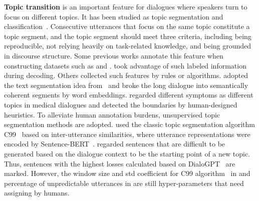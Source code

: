 \textbf{Topic transition} is an important feature for dialogues where speakers turn to focus on different topics. It has been studied as topic segmentation and classification~\cite{takanobu2018weakly}. Consecutive utterances that focus on the same topic constitute a topic segment, and the topic segment should meet three criteria\cite{arguello2006topic}, including being reproducible, not relying heavily on task-related knowledge,  and being grounded in discourse structure.
Some previous works annotate this feature when constructing datasets such as \citet{carletta2005ami} and \citet{janin2003icsi}. 
\citet{di2020da} took advantage of such labeled information during decoding.
Others collected such features by rules or algorithms.
\cite{asi2022end} adopted the text segmentation idea from~\cite{alemi2015text} and broke the long dialogue into semantically coherent segments by word embeddings.
\citet{liu2019topic} regarded different symptoms as different topics in medical dialogues and detected the boundaries by human-designed heuristics.
To alleviate human annotation burdens, unsupervised topic segmentation methods are adopted. \citet{chen2020multi} used the classic topic segmentation algorithm C99~\cite{choi2000advances} based on inter-utterance similarities, where utterance representations were encoded by Sentence-BERT~\cite{reimers2019sentence}. \citet{feng2021language} regarded sentences that are difficult to be generated based on the dialogue context to be the starting point of a new topic. Thus, sentences with the highest losses calculated based on DialoGPT~\cite{zhang2020dialogpt} are marked.
However, the window size and std coefficient for C99 algorithm~\cite{choi2000advances} in 
\citet{chen2020multi} and percentage of unpredictable utterances in \citet{feng2021language} are still hyper-parameters that need assigning by humans.
